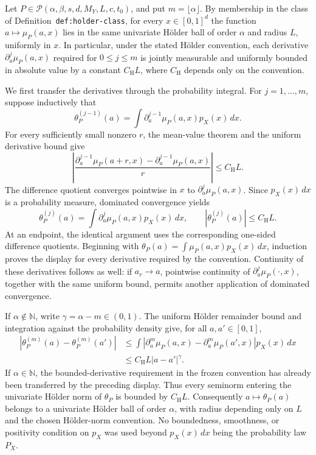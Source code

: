 Let \(P\in\mathcal P(\alpha,\beta,s,d,M_Y,L,c,t_0)\), and put \(m=\lfloor\alpha\rfloor\). By membership in the class of Definition~\texttt{def:holder-class}, for every \(x\in[0,1]^d\) the function \(a\mapsto\mu_P(a,x)\) lies in the same univariate Hölder ball of order \(\alpha\) and radius \(L\), uniformly in \(x\). In particular, under the stated Hölder convention, each derivative \(\partial_a^j\mu_P(a,x)\) required for \(0\le j\le m\) is jointly measurable and uniformly bounded in absolute value by a constant \(C_{\mathrm H}L\), where \(C_{\mathrm H}\) depends only on the convention.

We first transfer the derivatives through the probability integral. For \(j=1,\ldots,m\), suppose inductively that
\[
\theta_P^{(j-1)}(a)=\int\partial_a^{j-1}\mu_P(a,x)p_X(x)\,dx.
\]
For every sufficiently small nonzero \(r\), the mean-value theorem and the uniform derivative bound give
\[
\left|\frac{\partial_a^{j-1}\mu_P(a+r,x)-\partial_a^{j-1}\mu_P(a,x)}{r}\right|\le C_{\mathrm H}L.
\]
The difference quotient converges pointwise in \(x\) to \(\partial_a^j\mu_P(a,x)\). Since \(p_X(x)\,dx\) is a probability measure, dominated convergence yields
\[
\theta_P^{(j)}(a)=\int\partial_a^j\mu_P(a,x)p_X(x)\,dx,
\qquad
|\theta_P^{(j)}(a)|\le C_{\mathrm H}L.
\]
At an endpoint, the identical argument uses the corresponding one-sided difference quotients. Beginning with \(\theta_P(a)=\int\mu_P(a,x)p_X(x)\,dx\), induction proves the display for every derivative required by the convention. Continuity of these derivatives follows as well: if \(a_r\to a\), pointwise continuity of \(\partial_a^j\mu_P(\cdot,x)\), together with the same uniform bound, permits another application of dominated convergence.

If \(\alpha\notin\mathbb N\), write \(\gamma=\alpha-m\in(0,1)\). The uniform Hölder remainder bound and integration against the probability density give, for all \(a,a'\in[0,1]\),
\[
\begin{aligned}
|\theta_P^{(m)}(a)-\theta_P^{(m)}(a')|
&\le \int |\partial_a^m\mu_P(a,x)-\partial_a^m\mu_P(a',x)|p_X(x)\,dx\\
&\le C_{\mathrm H}L|a-a'|^\gamma.
\end{aligned}
\]
If \(\alpha\in\mathbb N\), the bounded-derivative requirement in the frozen convention has already been transferred by the preceding display. Thus every seminorm entering the univariate Hölder norm of \(\theta_P\) is bounded by \(C_{\mathrm H}L\). Consequently \(a\mapsto\theta_P(a)\) belongs to a univariate Hölder ball of order \(\alpha\), with radius depending only on \(L\) and the chosen Hölder-norm convention. No boundedness, smoothness, or positivity condition on \(p_X\) was used beyond \(p_X(x)\,dx\) being the probability law \(P_X\).